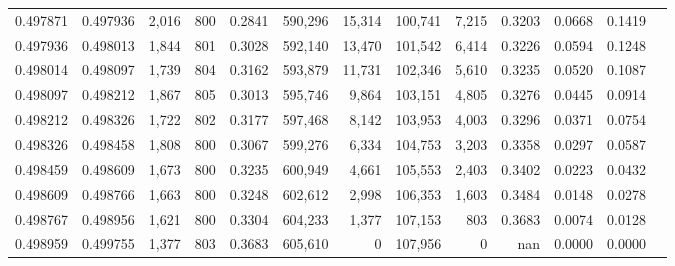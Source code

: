 \begin{tabular}{rrrrrrrrrrrrr}
0.497871 & 0.497936 &  2,016 & 800 &                                     0.2841 & 590,296 &  15,314 & 100,741 &   7,215 & 0.3203 & 0.0668 & 0.1419 \\
0.497936 & 0.498013 &  1,844 & 801 &                                     0.3028 & 592,140 &  13,470 & 101,542 &   6,414 & 0.3226 & 0.0594 & 0.1248 \\
0.498014 & 0.498097 &  1,739 & 804 &                                     0.3162 & 593,879 &  11,731 & 102,346 &   5,610 & 0.3235 & 0.0520 & 0.1087 \\
0.498097 & 0.498212 &  1,867 & 805 &                                     0.3013 & 595,746 &   9,864 & 103,151 &   4,805 & 0.3276 & 0.0445 & 0.0914 \\
0.498212 & 0.498326 &  1,722 & 802 &                                     0.3177 & 597,468 &   8,142 & 103,953 &   4,003 & 0.3296 & 0.0371 & 0.0754 \\
0.498326 & 0.498458 &  1,808 & 800 &                                     0.3067 & 599,276 &   6,334 & 104,753 &   3,203 & 0.3358 & 0.0297 & 0.0587 \\
0.498459 & 0.498609 &  1,673 & 800 &                                     0.3235 & 600,949 &   4,661 & 105,553 &   2,403 & 0.3402 & 0.0223 & 0.0432 \\
0.498609 & 0.498766 &  1,663 & 800 &                                     0.3248 & 602,612 &   2,998 & 106,353 &   1,603 & 0.3484 & 0.0148 & 0.0278 \\
0.498767 & 0.498956 &  1,621 & 800 &                                     0.3304 & 604,233 &   1,377 & 107,153 &     803 & 0.3683 & 0.0074 & 0.0128 \\
0.498959 & 0.499755 &  1,377 & 803 &                                     0.3683 & 605,610 &       0 & 107,956 &       0 &    nan & 0.0000 & 0.0000 \\
\bottomrule
\end{tabular}
